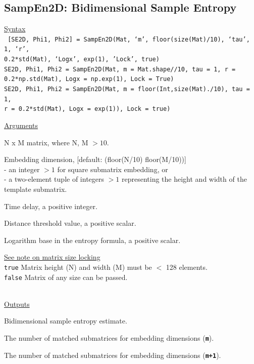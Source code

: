 \documentclass[12pt, a4paper, titlepage, openany]{book}
\begin{document}
\newpage
\subsection{\normalsize SampEn2D: \hspace{15mm} Bidimensional Sample Entropy}
\noindent\ul{Syntax} \vspace{6mm} \\ \noindent \texttt{\footnotesize
[SE2D, Phi1, Phi2] = SampEn2D(Mat, ‘m’, floor(size(Mat)/10), ‘tau’, 1, ‘r’, \\0.2*std(Mat), ‘Logx’, exp(1), 'Lock', true)\\
SE2D, Phi1, Phi2  = SampEn2D(Mat, m = Mat.shape//10, tau = 1, r = 0.2*np.std(Mat), Logx = np.exp(1), Lock = True)\\
SE2D, Phi1, Phi2 = SampEn2D(Mat, m = floor(Int,size(Mat)./10), tau = 1, \\ r = 0.2*std(Mat), Logx = exp(1)), Lock = true)}

\noindent \ul{Arguments}
\begin{description}[labelsep=1cm, labelwidth=2cm, nosep,,style=multiline,leftmargin=3cm]\footnotesize
\item[\texttt{Mat}]		N x M matrix,  where N, M $> 10$.
\item[\texttt{m}]		Embedding dimension, [default: (floor(N/10) floor(M/10))]\\
						- an integer $> 1$ for square submatrix embedding, or\\
						- a two-element tuple of integers $> 1$ representing the height and width of the template submatrix.
\item[\texttt{tau}]		Time delay, a positive integer.
\item[\texttt{r}]		Distance threshold value, a positive scalar.
\item[\texttt{Logx}]	Logarithm base in the entropy formula, a positive scalar.
\item[\texttt{Lock}]	\hyperlink{bidinote}{\ul{See note on matrix size locking}}\\
					\texttt{true} \hspace{15pt} Matrix height (N) and width (M) must be $<$ 128 elements.\\
					\texttt{false}\hspace{12pt} Matrix of any size can be passed.\\ \
\end{description}

\noindent \ul{Outputs}
\begin{description}[labelsep=1cm, labelwidth=2cm, nosep, style=multiline,leftmargin=3cm]\footnotesize
\item[\texttt{SE2D}]		Bidimensional sample entropy estimate.
\item[\texttt{Phi1}]		The number of matched submatrices for embedding dimensions (\texttt{\textbf{m}}).
\item[\texttt{Phi2}]		The number of matched submatrices for embedding dimensions (\texttt{\textbf{m+1}}).
\end{description}
\end{document}
